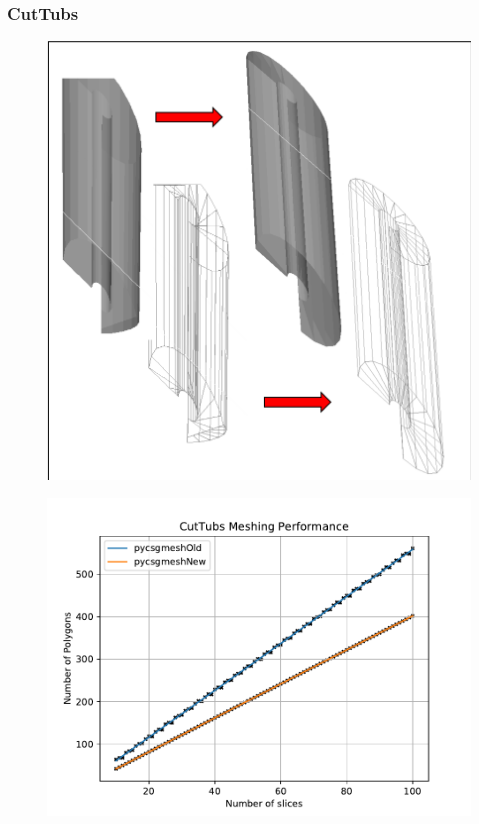 \documentclass[12pt,a4paper]{article}
\begin{document}
\subsubsection{CutTubs}

\begin{figure}[h!]
\centering
\begin{minipage}{.2\textwidth}
  \centering
  \includegraphics[height=1\linewidth]{Images//Meshes//CutTubs.png}
  \label{fig:test1}
\end{minipage}%
\begin{minipage}{.3\textwidth}
  \centering
  \includegraphics[scale=0.35]{Images//Quad_fits//CutTubs_quad.pdf}
  \label{fig:test2}
\end{minipage}%
\end{figure}
\end{document}
